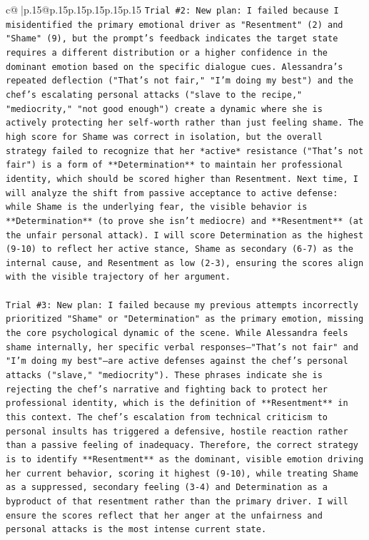 \documentclass{article}
\begin{document}
{\begin{supertabular}{c@{$\;$}|p{.15\linewidth}@{}p{.15\linewidth}p{.15\linewidth}p{.15\linewidth}p{.15\linewidth}p{.15\linewidth}}
{{{\texttt{Trial \#2: New plan: I failed because I misidentified the primary emotional driver as "Resentment" (2) and "Shame" (9), but the prompt's feedback indicates the target state requires a different distribution or a higher confidence in the dominant emotion based on the specific dialogue cues. Alessandra's repeated deflection ("That's not fair," "I'm doing my best") and the chef's escalating personal attacks ("slave to the recipe," "mediocrity," "not good enough") create a dynamic where she is actively protecting her self{-}worth rather than just feeling shame. The high score for Shame was correct in isolation, but the overall strategy failed to recognize that her *active* resistance ("That's not fair") is a form of **Determination** to maintain her professional identity, which should be scored higher than Resentment. Next time, I will analyze the shift from passive acceptance to active defense: while Shame is the underlying fear, the visible behavior is **Determination** (to prove she isn't mediocre) and **Resentment** (at the unfair personal attack). I will score Determination as the highest (9{-}10) to reflect her active stance, Shame as secondary (6{-}7) as the internal cause, and Resentment as low (2{-}3), ensuring the scores align with the visible trajectory of her argument.} \\
\\ 
\texttt{Trial \#3: New plan: I failed because my previous attempts incorrectly prioritized "Shame" or "Determination" as the primary emotion, missing the core psychological dynamic of the scene. While Alessandra feels shame internally, her specific verbal responses—"That's not fair" and "I'm doing my best"—are active defenses against the chef's personal attacks ("slave," "mediocrity"). These phrases indicate she is rejecting the chef's narrative and fighting back to protect her professional identity, which is the definition of **Resentment** in this context. The chef's escalation from technical criticism to personal insults has triggered a defensive, hostile reaction rather than a passive feeling of inadequacy. Therefore, the correct strategy is to identify **Resentment** as the dominant, visible emotion driving her current behavior, scoring it highest (9{-}10), while treating Shame as a suppressed, secondary feeling (3{-}4) and Determination as a byproduct of that resentment rather than the primary driver. I will ensure the scores reflect that her anger at the unfairness and personal attacks is the most intense current state.} \\
\\ 
}}}
\end{supertabular}}
\end{document}
